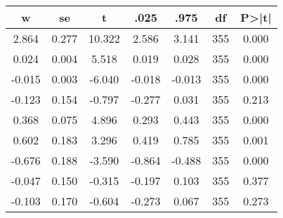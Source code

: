 \begin{tabular}{ccccccc}
\hline \hline
     w &    se &      t &   .025 &   .975 &  df &  P>|t| \\
\hline \hline
 2.864 & 0.277 & 10.322 &  2.586 &  3.141 & 355 &  0.000 \\
 0.024 & 0.004 &  5.518 &  0.019 &  0.028 & 355 &  0.000 \\
-0.015 & 0.003 & -6.040 & -0.018 & -0.013 & 355 &  0.000 \\
-0.123 & 0.154 & -0.797 & -0.277 &  0.031 & 355 &  0.213 \\
 0.368 & 0.075 &  4.896 &  0.293 &  0.443 & 355 &  0.000 \\
 0.602 & 0.183 &  3.296 &  0.419 &  0.785 & 355 &  0.001 \\
-0.676 & 0.188 & -3.590 & -0.864 & -0.488 & 355 &  0.000 \\
-0.047 & 0.150 & -0.315 & -0.197 &  0.103 & 355 &  0.377 \\
-0.103 & 0.170 & -0.604 & -0.273 &  0.067 & 355 &  0.273 \\
\hline \hline
\end{tabular}
